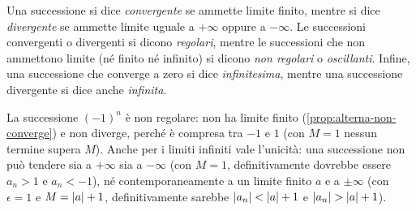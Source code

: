 \begin{marginfigure}
\centering
{}
\caption{$a_{n}=n^{2}\to+\infty$: fissato un livello $M$, i termini con $n>\nu=\sqrt M$
stanno tutti al di sopra di $M$.}
\end{marginfigure}

\begin{definizione}[Terminologia]
Una successione si dice \emph{convergente} se ammette limite finito, mentre si dice
\emph{divergente} se ammette limite uguale a $+\infty$ oppure a $-\infty$. Le successioni
convergenti o divergenti si dicono \emph{regolari}, mentre le successioni che non
ammettono limite (né finito né infinito) si dicono \emph{non regolari} o
\emph{oscillanti}. Infine, una successione che converge a zero si dice
\emph{infinitesima}, mentre una successione divergente si dice anche \emph{infinita}.
\end{definizione}

La successione $(-1)^{n}$ è non regolare: non ha limite finito
(\cref{prop:alterna-non-converge}) e non diverge, perché è compresa tra $-1$ e $1$ (con
$M=1$ nessun termine supera $M$). Anche per i limiti infiniti vale l'unicità: una
successione non può tendere sia a $+\infty$ sia a $-\infty$ (con $M=1$, definitivamente
dovrebbe essere $a_{n}>1$ e $a_{n}<-1$), né contemporaneamente a un limite finito $a$ e a
$\pm\infty$ (con $\epsilon=1$ e $M=\lvert a\rvert+1$, definitivamente sarebbe
$\lvert a_{n}\rvert<\lvert a\rvert+1$ e $\lvert a_{n}\rvert>\lvert a\rvert+1$).


